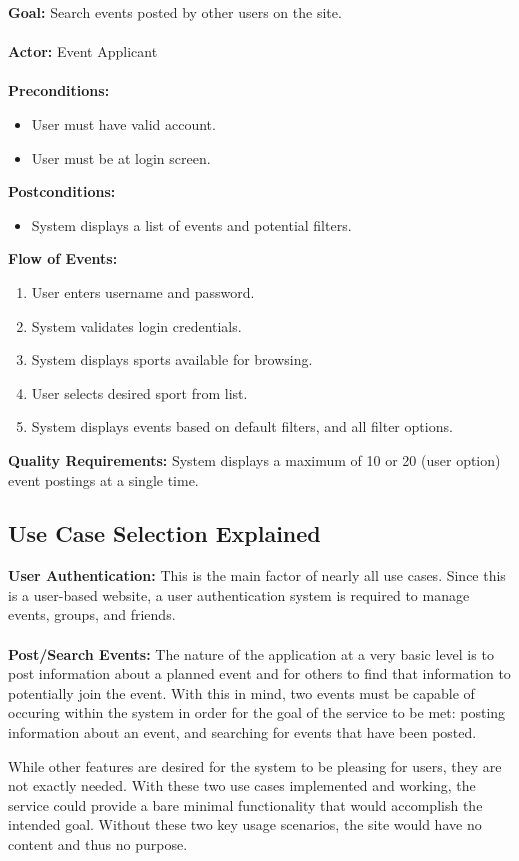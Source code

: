 \documentclass[a4paper]{article}
\begin{document}
\textbf{Goal:}
Search events posted by other users on the site.\\
\\
\textbf{Actor:}
Event Applicant\\
\\
\textbf{Preconditions:}
\begin{itemize}
   \item User must have valid account.
   \item User must be at login screen.
\end{itemize}
\textbf{Postconditions:} 
\begin{itemize}
   \item System displays a list of events and potential filters.
\end{itemize}
\textbf{Flow of Events:}
\begin{enumerate}
   \item User enters username and password.
   \item System validates login credentials.
   \item System displays sports available for browsing.
   \item User selects desired sport from list.
   \item System displays events based on default filters, and all filter options.
\end{enumerate}
\textbf{Quality Requirements:}
System displays a maximum of 10 or 20 (user option) event postings at a single time.

\subsection{Use Case Selection Explained}
\textbf{User Authentication:} This is the main factor of nearly all use cases. Since this is a user-based website, a user authentication system is required to manage events, groups, and friends.\\
\\
\textbf{Post/Search Events:} 
The nature of the application at a very basic level is to post information about a planned event and for others to find that information to potentially join the event. With this in mind, two events must be capable of occuring within the system in order for the goal of the service to be met: posting information about an event, and searching for events that have been posted. 

While other features are desired for the system to be pleasing for users, they are not exactly needed. With these two use cases implemented and working, the service could provide a bare minimal functionality that would accomplish the intended goal. Without these two key usage scenarios, the site would have no content and thus no purpose.
\end{document}
